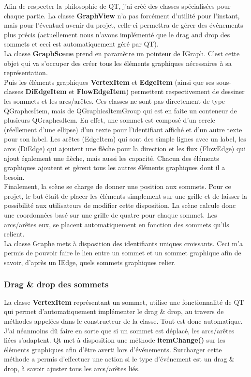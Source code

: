 \documentclass[french]{article}
\begin{document}
				Afin de respecter la philosophie de QT, j'ai créé des classes spécialisées pour chaque partie. La classe \textbf{GraphView} n'a pas forcément d'utilité pour l'instant, mais pour l'éventuel avenir du projet, celle-ci permettra de gérer des événements plus précis (actuellement nous n'avons implémenté que le drag and drop des sommets et ceci est automatiquement géré par QT). \\
				La classe \textbf{GraphScene} prend en paramètre un pointeur de IGraph. C'est cette objet qui va s'occuper des créer tous les éléments graphiques nécessaires à sa représentation. \\
				Puis les éléments graphiques \textbf{VertexItem} et \textbf{EdgeItem} (ainsi que ses sous-classes \textbf{DiEdgeItem} et \textbf{FlowEdgeItem}) permettent respectivement de dessiner les sommets et les arcs/arêtes. Ces classes ne sont pas directement de type QGraphcsItem, mais de QGraphicsItemGroup qui est en faite un conteneur de plusieurs QGraphcsItem. En effet, une sommet est composé d'un cercle (réellement d'une ellipse) d'un texte pour l'identifiant affiché et d'un autre texte pour son label. Les arêtes (EdgeItem) qui sont des simple lignes avec un label, les arcs (DiEdge) qui ajoutent une flèche pour la direction et les flux (FlowEdge) qui ajout également une flèche, mais aussi les capacité. Chacun des éléments graphiques ajoutent et gèrent tous les autres éléments graphiques dont il a besoin. \\
				
				Finalement, la scène se charge de donner une position aux sommets. Pour ce projet, le but était de placer les éléments simplement sur une grille et de laisser la possibilité aux utilisateurs de modifier cette disposition. La scène calcule donc une coordonnées basé sur une grille de quatre pour chaque sommet. Les arcs/arêtes eux, se placent automatiquement en fonction des sommets qu'ils relient. \\
				La classe Graphe mets à disposition des identifiants uniques croissants. Ceci m'a permis de pouvoir faire le lien entre un sommet et un sommet graphique afin de savoir, d'après un IEdge, quels sommets graphiques relier.
		
			\subsubsection{Drag \& drop des sommets}
				La classe \textbf{VertexItem} représentant un sommet, utilise une fonctionnalité de QT qui permet d'automatiquement implémenter le drag \& drop, au travers de méthodes appelées dans le constructeur de la classe. Tout est donc automatique. \\
				J'ai néanmoins dû faire en sorte que si un sommet est déplacé, les arcs/arêtes liées s'adaptent. Qt met à disposition une méthode \textbf{itemChange()} sur les éléments graphiques afin d'être averti lors d'événements. Surcharger cette méthode a permis d'effectuer une action si le type d'événement est un drag \& drop, à savoir ajuster tous les arcs/arêtes liés.
				
\end{document}
